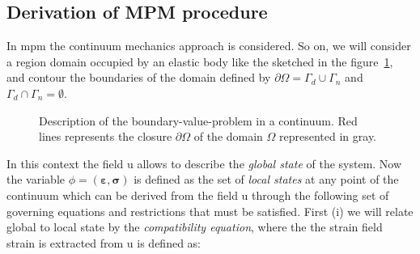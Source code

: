 \documentclass[preprint,12pt,a4paper]{elsarticle}
\newcommand{\tens}[1]{
  \ensuremath{\mathbf{{#1}}}
}
\begin{document}
\subsection{Derivation of MPM procedure}
\label{sec:derivation-mpm}

In \acrshort{mpm} the continuum mechanics approach is considered. So on, we will consider a region \gls{domain} occupied by an elastic body like
the sketched in the figure~\ref{fig:Continuum-solid}, and \gls{contour} the boundaries of the domain defined by $\partial \Omega
= \Gamma_d \cup \Gamma_n$ and $\Gamma_d \cap  \Gamma_n = \emptyset$.
\begin{figure}
  \centering
  \caption{Description of the boundary-value-problem in a
    continuum. Red lines represents the closure $\partial \Omega$
    of the domain $\Omega$ represented in gray.}
  \label{fig:Continuum-solid}
\end{figure}
In this context the field \gls{u} allows to describe the \textit{global state}
of the system. Now the variable $\phi =
(\tens{\varepsilon},\tens{\sigma})$ is defined as the set of \textit{local
  states} at any point of the continuum which can be derived from the
field \gls{u} through the following set of governing equations and
restrictions that must be satisfied. First (i) we will relate
  global to local state by the \textit{compatibility equation}, where the the strain field \gls{strain} is extracted from \gls{u} is defined as:
\end{document}
